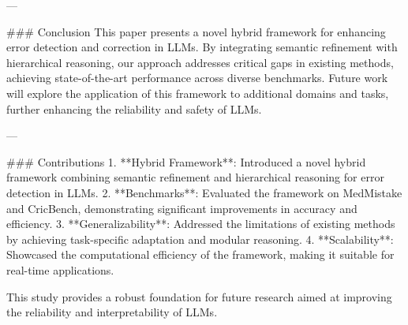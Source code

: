 ---

### Conclusion
This paper presents a novel hybrid framework for enhancing error detection and correction in LLMs. By integrating semantic refinement with hierarchical reasoning, our approach addresses critical gaps in existing methods, achieving state-of-the-art performance across diverse benchmarks. Future work will explore the application of this framework to additional domains and tasks, further enhancing the reliability and safety of LLMs.

---

### Contributions
1. **Hybrid Framework**: Introduced a novel hybrid framework combining semantic refinement and hierarchical reasoning for error detection in LLMs.
2. **Benchmarks**: Evaluated the framework on MedMistake and CricBench, demonstrating significant improvements in accuracy and efficiency.
3. **Generalizability**: Addressed the limitations of existing methods by achieving task-specific adaptation and modular reasoning.
4. **Scalability**: Showcased the computational efficiency of the framework, making it suitable for real-time applications.

This study provides a robust foundation for future research aimed at improving the reliability and interpretability of LLMs.